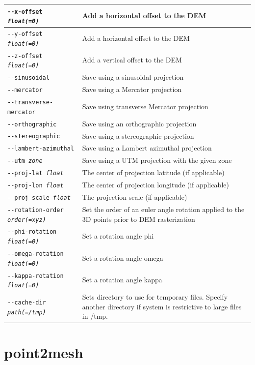\begin{longtable}{|l|p{10cm}|}
\texttt{-\/-x-offset \textit{float(=0)}} & Add a horizontal offset to the \ac{DEM} \\ \hline
\texttt{-\/-y-offset \textit{float(=0)}} & Add a horizontal offset to the \ac{DEM} \\ \hline
\texttt{-\/-z-offset \textit{float(=0)}} & Add a vertical offset to the \ac{DEM} \\ \hline
\texttt{-\/-sinusoidal} & Save using a sinusoidal projection \\ \hline
\texttt{-\/-mercator} & Save using a Mercator projection \\ \hline
\texttt{-\/-transverse-mercator} & Save using transverse Mercator projection \\ \hline
\texttt{-\/-orthographic} & Save using an orthographic projection \\ \hline
\texttt{-\/-stereographic} & Save using a stereographic projection \\ \hline
\texttt{-\/-lambert-azimuthal} & Save using a Lambert azimuthal projection \\ \hline
\texttt{-\/-utm \textit{zone}} & Save using a UTM projection with the given zone \\ \hline
\texttt{-\/-proj-lat \textit{float}} & The center of projection latitude (if applicable) \\ \hline
\texttt{-\/-proj-lon \textit{float}} & The center of projection longitude (if applicable) \\ \hline
\texttt{-\/-proj-scale \textit{float}} & The projection scale (if applicable) \\ \hline
\texttt{-\/-rotation-order \textit{order(=xyz)}} & Set the order of an euler angle rotation applied to the 3D points prior to \ac{DEM} rasterization \\ \hline
\texttt{-\/-phi-rotation \textit{float(=0)}} & Set a rotation angle phi \\ \hline
\texttt{-\/-omega-rotation \textit{float(=0)}} & Set a rotation angle omega \\ \hline
\texttt{-\/-kappa-rotation \textit{float(=0)}} & Set a rotation angle kappa \\ \hline
\texttt{-\/-cache-dir \textit{path(=/tmp)}} & Sets directory to use for temporary files. Specify another directory if system is restrictive to large files in /tmp. \\ \hline
\end{longtable}

\section{point2mesh}
\label{point2mesh}

